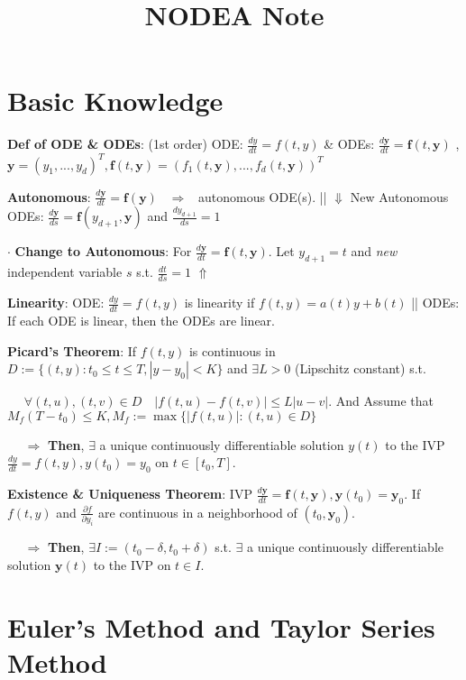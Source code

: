 \documentclass[9pt]{article}
\title{NODEA Note}
\author{}
\date{}
\begin{document}
\maketitle
\thispagestyle{fancy}
\vspace{-3.5cm}

\fontsize{10pt}{11pt}\selectfont
\setlength{\parindent}{8pt}


\section{Basic Knowledge} %

\textbf{Def of ODE \& ODEs}: {\scriptsize (1st order)} ODE: $\frac{dy}{dt}=f(t,y)$ \quad \& \quad ODEs: $\frac{d\mathbf{y}}{dt}=\mathbf{f}(t,\mathbf{y})$ , {\footnotesize $\mathbf{y}=(y_1,...,y_d)^T,\mathbf{f}(t,\mathbf{y})=(f_1(t,\mathbf{y}),...,f_d(t,\mathbf{y}))^T$}

\textbf{Autonomous}: $\frac{d\mathbf{y}}{dt}=\mathbf{f}(\mathbf{y})$ \ $\Rightarrow$ \ autonomous ODE(s). \quad \quad \quad || $\Downarrow$ New Autonomous ODEs: $\frac{d\mathbf{y}}{ds}=\mathbf{f}(y_{d+1},\mathbf{y})$ and $\frac{dy_{d+1}}{ds}=1$

$\cdot$ \textbf{Change to Autonomous}: For $\frac{d\mathbf{y}}{dt}=\mathbf{f}(t,\mathbf{y})$. Let $y_{d+1}=t$ and \textit{new} independent variable $s$ s.t. $\frac{dt}{ds}=1$ $\Uparrow$

\textbf{Linearity}: ODE: $\frac{dy}{dt}=f(t,y)$ is linearity if $f(t,y)=a(t)y+b(t)$ \quad || ODEs: {\small If each ODE is linear, then the ODEs are linear.}

\textbf{Picard's Theorem}: If $f(t,y)$ is continuous in $D:=\{(t,y):t_0\leq t\leq T,|y-y_0|<K\}$ and $\exists L>0$ {\footnotesize (Lipschitz constant)} s.t.

$\quad$ $\forall (t,u),(t,v)\in D \quad|f(t,u)-f(t,v)|\leq L|u-v|$. And Assume that $M_f(T-t_0)\leq K,M_f:=\max\{|f(t,u)|:(t,u)\in D\}$

$\quad$ $\Rightarrow$ \textbf{Then}, $\exists$ a unique continuously differentiable solution $y(t)$ to the IVP $\frac{dy}{dt}=f(t,y),y(t_0)=y_0$ on $t\in[t_0,T]$.

\textbf{Existence \& Uniqueness Theorem}: IVP $\frac{d\mathbf{y}}{dt}=\mathbf{f}(t,\mathbf{y}),\mathbf{y}(t_0)=\mathbf{y}_0$. If $f(t,y)$ and $\frac{\partial f}{\partial y_i}$ are continuous in a neighborhood of $(t_0,\mathbf{y}_0)$.

$\quad$ $\Rightarrow$ \textbf{Then}, $\exists I:=(t_0-\delta,t_0+\delta)$ s.t. $\exists$ a unique continuously differentiable solution $\mathbf{y}(t)$ to the IVP on $t\in I$.


\section{Euler's Method and Taylor Series Method} %
\end{document}
